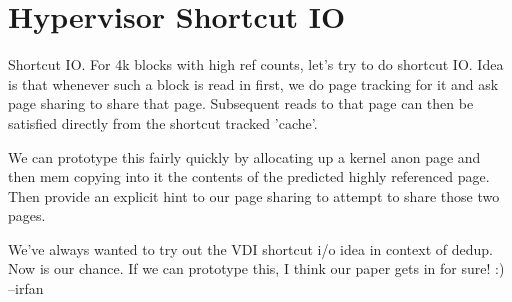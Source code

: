 
\section{Hypervisor Shortcut IO}
\label{sec:integration}

\begin{notes}
  Shortcut IO. For 4k blocks with high ref counts, let's try to do shortcut IO.
  Idea is that whenever such a block is read in first, we do page tracking for it
  and ask page sharing to share that page. Subsequent reads to that page can then be 
  satisfied directly from the shortcut tracked 'cache'.

  We can prototype this fairly quickly by allocating up a kernel anon page and then
  mem copying into it the contents of the predicted highly referenced page. Then provide
  an explicit hint to our page sharing to attempt to share those two pages.

  We've always wanted to try out the VDI shortcut i/o idea in context of dedup. Now is our
  chance. If we can prototype this, I think our paper gets in for sure! :) --irfan

\end{notes}

